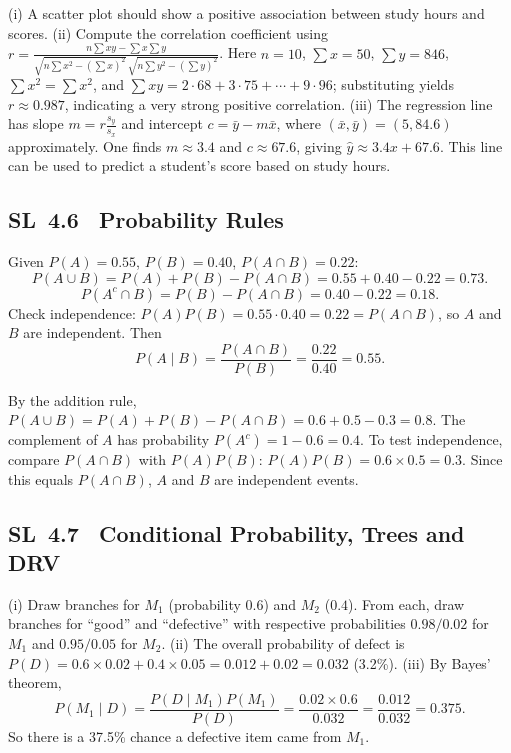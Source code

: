 \documentclass[11pt]{article}
\newcommand{\tocsubsection}[1]{\subsection{#1}}
\begin{document}
\begin{solution}
(i) A scatter plot should show a positive association between study hours and
scores.  (ii) Compute the correlation coefficient using
\(r=\frac{n\sum xy-\sum x\sum y}{\sqrt{n\sum x^2-(\sum x)^2}\,\sqrt{n\sum y^2-(\sum y)^2}}\).
Here $n=10$, $\sum x=50$, $\sum y=846$, $\sum x^2=\sum x^2$, and
$\sum xy=2\cdot68+3\cdot75+\cdots+9\cdot96$; substituting yields
$r\approx0.987$, indicating a very strong positive correlation.  (iii)
The regression line has slope
$m=r\tfrac{s_y}{s_x}$ and intercept $c=\bar{y}-m\bar{x}$, where
$(\bar{x},\bar{y})=(5,84.6)$ approximately.  One finds $m\approx3.4$ and
$c\approx67.6$, giving $\hat{y}\approx3.4x+67.6$.  This line can be used to
predict a student’s score based on study hours.
\end{solution}

\tocsubsection{SL 4.6 \; Probability Rules}

\begin{solution}
Given $P(A)=0.55$, $P(B)=0.40$, $P(A\cap B)=0.22$:
\[
P(A\cup B)=P(A)+P(B)-P(A\cap B)=0.55+0.40-0.22=0.73.
\]
\[
P(A^c\cap B)=P(B)-P(A\cap B)=0.40-0.22=0.18.
\]
Check independence: $P(A)P(B)=0.55\cdot0.40=0.22=P(A\cap B)$, so $A$ and $B$ are independent. Then
\[
P(A\mid B)=\frac{P(A\cap B)}{P(B)}=\frac{0.22}{0.40}=0.55.
\]
\end{solution}




\begin{solution}
By the addition rule,
$P(A\cup B)=P(A)+P(B)-P(A\cap B)=0.6+0.5-0.3=0.8$.
The complement of $A$ has probability $P(A^c)=1-0.6=0.4$.
To test independence, compare $P(A\cap B)$ with $P(A)P(B)$:
$P(A)P(B)=0.6\times0.5=0.3$.  Since this equals $P(A\cap B)$, $A$ and
$B$ are independent events.
\end{solution}


\tocsubsection{SL 4.7 \; Conditional Probability, Trees and DRV}

\begin{solution}
(i) Draw branches for $M_1$ (probability $0.6$) and $M_2$ ($0.4$).  From
each, draw branches for ``good'' and ``defective'' with respective
probabilities $0.98/0.02$ for $M_1$ and $0.95/0.05$ for $M_2$.  (ii) The
overall probability of defect is
$P(D)=0.6\times0.02+0.4\times0.05=0.012+0.02=0.032$ (3.2\%).  (iii) By
Bayes’ theorem,
\[P(M_1\mid D)=\frac{P(D\mid M_1)P(M_1)}{P(D)}=
  \frac{0.02\times0.6}{0.032}=\frac{0.012}{0.032}=0.375.
\]
So there is a 37.5\% chance a defective item came from $M_1$.
\end{solution}
\end{document}
